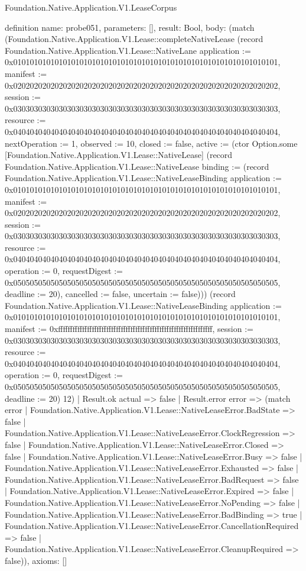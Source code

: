 \begin{lexlean}{Foundation.Native.Application.V1.LeaseCorpus}
\begin{semanticmodule}
definition{
  name: probe051,
  parameters: [],
  result: Bool,
  body: (match (Foundation.Native.Application.V1.Lease::completeNativeLease (record Foundation.Native.Application.V1.Lease::NativeLane {application := 0x0101010101010101010101010101010101010101010101010101010101010101, manifest := 0x0202020202020202020202020202020202020202020202020202020202020202, session := 0x0303030303030303030303030303030303030303030303030303030303030303, resource := 0x0404040404040404040404040404040404040404040404040404040404040404, nextOperation := 1, observed := 10, closed := false, active := (ctor Option.some [Foundation.Native.Application.V1.Lease::NativeLease] (record Foundation.Native.Application.V1.Lease::NativeLease {binding := (record Foundation.Native.Application.V1.Lease::NativeLeaseBinding {application := 0x0101010101010101010101010101010101010101010101010101010101010101, manifest := 0x0202020202020202020202020202020202020202020202020202020202020202, session := 0x0303030303030303030303030303030303030303030303030303030303030303, resource := 0x0404040404040404040404040404040404040404040404040404040404040404, operation := 0, requestDigest := 0x0505050505050505050505050505050505050505050505050505050505050505, deadline := 20}), cancelled := false, uncertain := false}))}) (record Foundation.Native.Application.V1.Lease::NativeLeaseBinding {application := 0x0101010101010101010101010101010101010101010101010101010101010101, manifest := 0xffffffffffffffffffffffffffffffffffffffffffffffffffffffffffffffff, session := 0x0303030303030303030303030303030303030303030303030303030303030303, resource := 0x0404040404040404040404040404040404040404040404040404040404040404, operation := 0, requestDigest := 0x0505050505050505050505050505050505050505050505050505050505050505, deadline := 20}) 12)
    | Result.ok actual => false
    | Result.error error => (match error
      | Foundation.Native.Application.V1.Lease::NativeLeaseError.BadState => false
      | Foundation.Native.Application.V1.Lease::NativeLeaseError.ClockRegression => false
      | Foundation.Native.Application.V1.Lease::NativeLeaseError.Closed => false
      | Foundation.Native.Application.V1.Lease::NativeLeaseError.Busy => false
      | Foundation.Native.Application.V1.Lease::NativeLeaseError.Exhausted => false
      | Foundation.Native.Application.V1.Lease::NativeLeaseError.BadRequest => false
      | Foundation.Native.Application.V1.Lease::NativeLeaseError.Expired => false
      | Foundation.Native.Application.V1.Lease::NativeLeaseError.NoPending => false
      | Foundation.Native.Application.V1.Lease::NativeLeaseError.BadBinding => true
      | Foundation.Native.Application.V1.Lease::NativeLeaseError.CancellationRequired => false
      | Foundation.Native.Application.V1.Lease::NativeLeaseError.CleanupRequired => false)),
  axioms: []
}


\end{semanticmodule}
\end{lexlean}
